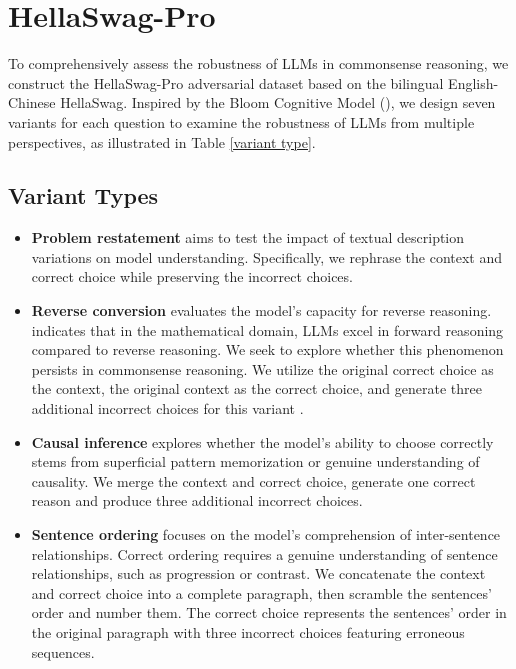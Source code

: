 \section{HellaSwag-Pro}

To comprehensively assess the robustness of LLMs in commonsense reasoning, we construct the HellaSwag-Pro adversarial dataset based on the bilingual English-Chinese HellaSwag. Inspired by the Bloom Cognitive Model (\citealp{krathwohl1973taxonomy}), we design seven variants for each question to examine the robustness of LLMs from multiple perspectives, as illustrated in Table \ref{variant type}.

\subsection{Variant Types}
\begin{itemize}[leftmargin=*]
    \item \textbf{Problem restatement} aims to test the impact of textual description variations on model understanding. Specifically, we rephrase the context and correct choice while preserving the incorrect choices.

    \item \textbf{Reverse conversion} evaluates the model's capacity for reverse reasoning. \citep{guo2024exploring} indicates that in the mathematical domain, LLMs excel in forward reasoning compared to reverse reasoning. We seek to explore whether this phenomenon persists in commonsense reasoning. We utilize the original correct choice as the context, the original context as the correct choice, and generate three additional incorrect choices for this variant .

    \item \textbf{Causal inference} explores whether the model's ability to choose correctly stems from superficial pattern memorization or genuine understanding of causality. We merge the context and correct choice, generate one correct reason and produce three additional incorrect choices.

    \item \textbf{Sentence ordering} focuses on the model's comprehension of inter-sentence relationships. Correct ordering requires a genuine understanding of sentence relationships, such as progression or contrast. We concatenate the context and correct choice into a complete paragraph, then scramble the sentences' order and number them. The correct choice represents the sentences' order in the original paragraph with three incorrect choices featuring erroneous sequences.


\end{itemize}
